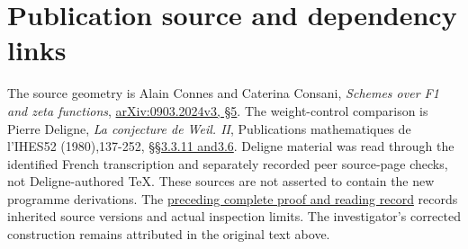 \section{Publication source and dependency
links}\label{publication-source-and-dependency-links-22}

The source geometry is Alain Connes and Caterina Consani, \emph{Schemes
over F1 and zeta functions},
\href{https://arxiv.org/abs/0903.2024v3}{arXiv:0903.2024v3, §5}. The
weight-control comparison is Pierre Deligne, \emph{La conjecture de
Weil. II}, Publications mathematiques de l'IHES52 (1980),137-252,
\href{https://www.numdam.org/item/PMIHES_1980__52__137_0/}{§§3.3.11
and3.6}. Deligne material was read through the identified French
transcription and separately recorded peer source-page checks, not
Deligne-authored TeX. These sources are not asserted to contain the new
programme derivations. The
\href{https://github.com/KokunoYumeto/zeta-function-research-reader/blob/36a82ecca98addb8a98b48204e349737856c7223/workbenches/splitzero-tandem/continuations/20260924-cohomology-weight-and-character-lifts/BUILD_AND_REVIEW.md}{preceding
complete proof and reading record} records inherited source versions and
actual inspection limits. The investigator's corrected construction
remains attributed in the original text above.
